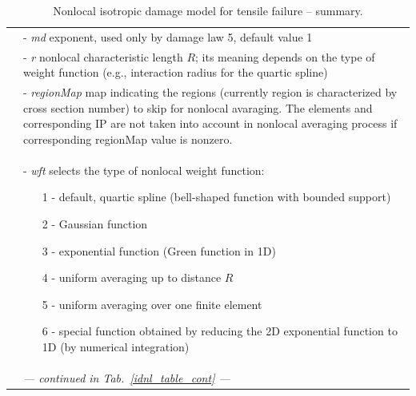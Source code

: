 \documentclass[a4paper]{article}
\newcommand{\param}[1]{{\it #1}}
\newenvironment{mmt}{\begin{tabular}{|l|p{9cm}|}}{\end{tabular}\\}
\newenvironment{mmt}{\begin{tabular}{|l|l|}}{\end{tabular}\\}
\begin{document}
\begin{table}[!htb]
\begin{mmt}
&- \param{md} exponent, used only by damage law 5, default value 1\\
&- \param{r} nonlocal characteristic length $R$; its meaning depends
on the type of weight function (e.g., interaction radius for the quartic spline)\\
&- \param{regionMap} map indicating the regions (currently region is
characterized by cross section number) to skip for nonlocal
avaraging. The elements and corresponding IP are not taken into
account in nonlocal averaging process if corresponding regionMap
value is nonzero.\\
&- \param{wft} selects the type of nonlocal weight function:
\begin{itemize}\setlength{\itemsep}{-3pt}
\item[1 -] default, quartic spline (bell-shaped function with bounded support)
\item[2 -] Gaussian function
\item[3 -] exponential function (Green function in 1D)
\item[4 -] uniform averaging up to distance $R$
\item[5 -] uniform averaging over one finite element
\item[6 -] special function obtained by reducing the 2D exponential function to 1D (by numerical integration)
\end{itemize}\\
& {\it --- continued in Tab.~\ref{idnl_table_cont} ---} \\
\hline
\end{mmt}
\caption{Nonlocal isotropic damage model for tensile failure -- summary.}
\label{idnl_table}
\end{table}
\end{document}
